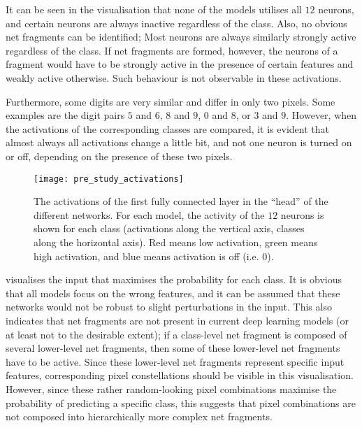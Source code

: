 It can be seen in the visualisation that none of the models utilises all $12$ neurons, and certain neurons are always inactive regardless of the class.
Also, no obvious net fragments can be identified;
Most neurons are always similarly strongly active regardless of the class.
If net fragments are formed, however, the neurons of a fragment would have to be strongly active in the presence of certain features and weakly active otherwise.
Such behaviour is not observable in these activations.

Furthermore, some digits are very similar and differ in only two pixels.
Some examples are the digit pairs $5$ and $6$, $8$ and $9$, $0$ and $8$, or $3$ and $9$.
However, when the activations of the corresponding classes are compared, it is evident that almost always all activations change a little bit, and not one neuron is turned on or off, depending on the presence of these two pixels.


\begin{figure}[h]
    \centering
    \texttt{[image: pre\_study\_activations]}
    \caption[Network activations of classification networks on the straight line dataset]{The activations of the first fully connected layer in the ``head'' of the different networks. For each model, the activity of the $12$ neurons is shown for each class (activations along the vertical axis, classes along the horizontal axis). Red means low activation, green means high activation, and blue means activation is off (i.e. $0$).}
\end{figure}


 visualises the input that maximises the probability for each class.
It is obvious that all models focus on the wrong features, and it can be assumed that these networks would not be robust to slight perturbations in the input.
This also indicates that net fragments are not present in current deep learning models (or at least not to the desirable extent);
if a class-level net fragment is composed of several lower-level net fragments, then some of these lower-level net fragments have to be active.
Since these lower-level net fragments represent specific input features, corresponding pixel constellations should be visible in this visualisation.
However, since these rather random-looking pixel combinations maximise the probability of predicting a specific class, this suggests that pixel combinations are not composed into hierarchically more complex net fragments.

